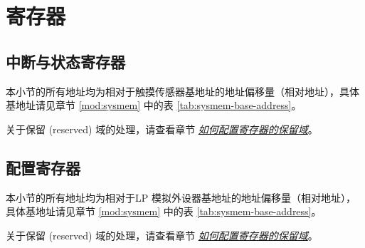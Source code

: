 \documentclass[main\_\_CN.tex]{subfiles}
\begin{document}


\newpage
\section{寄存器}

\subsection{中断与状态寄存器}
\label{sec:tchsen-status-reg}

本小节的所有地址均为相对于触摸传感器基地址的地址偏移量（相对地址），具体基地址请见章节 \ref{mod:sysmem} \textit{} 中的表 \ref{tab:sysmem-base-address}。

关于保留 (reserved) 域的处理，请查看章节 \hyperref[programming-reserved-field]{\textit{如何配置寄存器的保留域}}。



\subsection{配置寄存器}
\label{sec:tchsen-config-reg}

本小节的所有地址均为相对于LP 模拟外设器基地址的地址偏移量（相对地址），具体基地址请见章节 \ref{mod:sysmem} \textit{} 中的表 \ref{tab:sysmem-base-address}。

关于保留 (reserved) 域的处理，请查看章节 \hyperref[programming-reserved-field]{\textit{如何配置寄存器的保留域}}。


\end{document}
